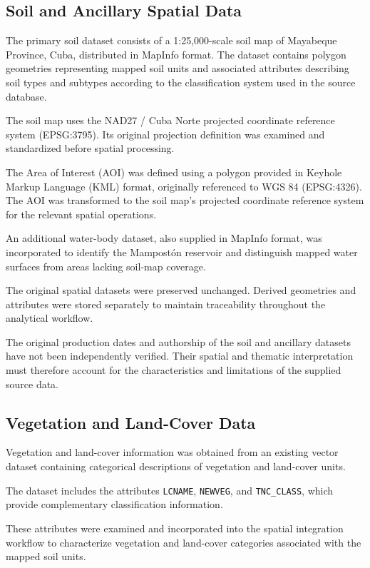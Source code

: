 \subsection{Soil and Ancillary Spatial Data}
\label{subsec:soil-data}

The primary soil dataset consists of a
1:25,000-scale soil map of Mayabeque Province,
Cuba, distributed in MapInfo format. The dataset
contains polygon geometries representing mapped
soil units and associated attributes describing
soil types and subtypes according to the
classification system used in the source database.

The soil map uses the NAD27 / Cuba Norte
projected coordinate reference system
(EPSG:3795). Its original projection definition
was examined and standardized before spatial
processing.

The Area of Interest (AOI) was defined using a
polygon provided in Keyhole Markup Language
(KML) format, originally referenced to WGS 84
(EPSG:4326). The AOI was transformed to the
soil map's projected coordinate reference system
for the relevant spatial operations.

An additional water-body dataset, also supplied
in MapInfo format, was incorporated to identify
the Mampostón reservoir and distinguish mapped
water surfaces from areas lacking soil-map
coverage.

The original spatial datasets were preserved
unchanged. Derived geometries and attributes
were stored separately to maintain traceability
throughout the analytical workflow.

The original production dates and authorship
of the soil and ancillary datasets have not
been independently verified. Their spatial
and thematic interpretation must therefore
account for the characteristics and limitations
of the supplied source data.


\subsection{Vegetation and Land-Cover Data}
\label{subsec:land-cover-data}

Vegetation and land-cover information was obtained
from an existing vector dataset containing
categorical descriptions of vegetation and
land-cover units.

The dataset includes the attributes
\texttt{LCNAME}, \texttt{NEWVEG}, and
\texttt{TNC\_CLASS}, which provide complementary
classification information.

These attributes were examined and incorporated
into the spatial integration workflow to
characterize vegetation and land-cover
categories associated with the mapped soil units.

